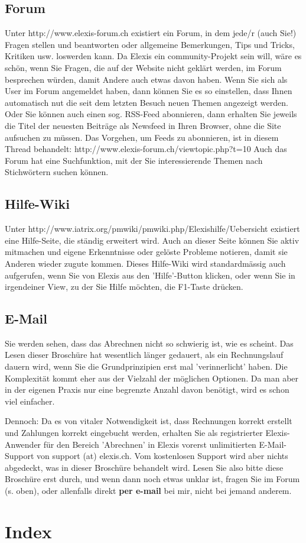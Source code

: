 \documentclass[a4paper]{scrartcl}
\begin{document}
\subsection{Forum}
Unter http://www.elexis-forum.ch existiert ein Forum, in dem jede/r (auch Sie!) Fragen stellen und beantworten oder allgemeine Bemerkungen, Tips und Tricks, Kritiken usw. loswerden kann. Da Elexis ein community-Projekt sein will, wäre es schön, wenn Sie Fragen, die auf der Website nicht geklärt werden, im Forum besprechen würden, damit Andere auch etwas davon haben.
Wenn Sie sich als User im Forum angemeldet haben, dann können Sie es so einstellen, dass Ihnen automatisch nut die seit dem letzten Besuch neuen Themen angezeigt werden. Oder Sie können auch einen sog. RSS-Feed abonnieren, dann erhalten Sie jeweils die Titel der neuesten Beiträge als Newsfeed in Ihren Browser, ohne die Site aufsuchen zu müssen. Das Vorgehen, um Feeds zu abonnieren, ist in diesem Thread behandelt: http://www.elexis-forum.ch/viewtopic.php?t=10
Auch das Forum hat eine Suchfunktion, mit der Sie interessierende Themen nach Stichwörtern suchen können.

\subsection{Hilfe-Wiki}
Unter http://www.iatrix.org/pmwiki/pmwiki.php/Elexishilfe/Uebersicht existiert eine Hilfe-Seite, die ständig erweitert wird. Auch an dieser Seite können Sie aktiv mitmachen und eigene Erkenntnisse oder gelöste Probleme notieren, damit sie Anderen wieder zugute kommen.
Dieses Hilfe-Wiki wird standardmässig auch aufgerufen, wenn Sie von Elexis aus den 'Hilfe'-Button klicken, oder wenn Sie in irgendeiner View, zu der Sie Hilfe möchten, die F1-Taste drücken.

\subsection{E-Mail}
Sie werden sehen, dass das Abrechnen nicht so schwierig ist, wie es scheint. Das Lesen dieser Broschüre hat wesentlich länger gedauert, als ein Rechnungslauf dauern wird, wenn Sie die Grundprinzipien erst mal 'verinnerlicht' haben. Die Komplexität kommt eher aus der Vielzahl der möglichen Optionen. Da man aber in der eigenen Praxis nur eine begrenzte Anzahl davon benötigt, wird es schon viel einfacher.

Dennoch: Da es von vitaler Notwendigkeit ist, dass Rechnungen korrekt erstellt und Zahlungen korrekt eingebucht werden, erhalten Sie als registrierter Elexis-Anwender für den Bereich 'Abrechnen' in Elexis vorerst unlimitierten E-Mail-Support von support (at) elexis.ch. Vom kostenlosen Support wird aber nichts abgedeckt, was in dieser Broschüre behandelt wird. Lesen Sie also bitte diese Broschüre erst durch, und wenn dann noch etwas unklar ist, fragen Sie im Forum (s. oben), oder allenfalls direkt \textbf{per e-mail} bei mir, nicht bei jemand anderem.
\clearpage
\section{Index}
\printindex
\end{document}
